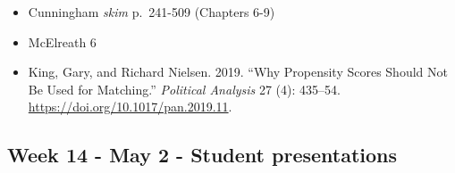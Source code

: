 \documentclass[
  10pt,
]{article}
\providecommand{\tightlist}{%
  \setlength{\itemsep}{0pt}\setlength{\parskip}{0pt}}
\begin{document}
\begin{itemize}
\tightlist
\item
  Cunningham \emph{skim} p.~241-509 (Chapters 6-9)
\item
  McElreath 6
\item
  King, Gary, and Richard Nielsen. 2019. ``Why Propensity Scores Should
  Not Be Used for Matching.'' \emph{Political Analysis} 27 (4): 435--54.
  \url{https://doi.org/10.1017/pan.2019.11}.
\end{itemize}

\hypertarget{week-14---may-2---student-presentations}{%
\subsection{Week 14 - May 2 - Student
presentations}\label{week-14---may-2---student-presentations}}
\end{document}
